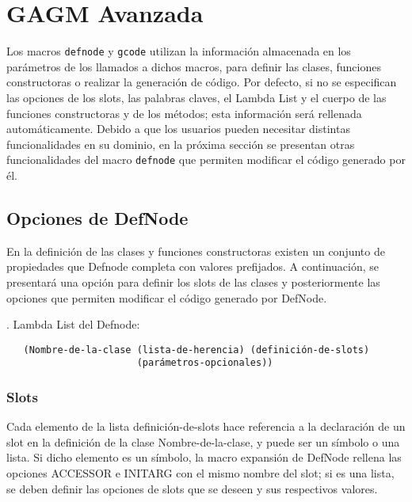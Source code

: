 \chapter{GAGM Avanzada}
\label{chap:GAGMA}


Los macros \texttt{defnode} y \texttt{gcode} utilizan la información almacenada en los parámetros de los llamados a dichos macros, para definir las clases, funciones constructoras o realizar la generación de código. Por defecto, si no se especifican las opciones de los slots, las palabras claves, el Lambda List y el cuerpo de las funciones constructoras y de los métodos; esta información será rellenada automáticamente. Debido a que los usuarios pueden necesitar distintas funcionalidades en su dominio, en la próxima sección se presentan otras funcionalidades del macro \texttt{defnode} que permiten modificar el código generado por él. 

\section{Opciones de DefNode}
\label{defnodeavanzado}
En la definición de las clases y funciones constructoras existen un conjunto de propiedades que Defnode completa con valores prefijados. A continuación, se presentará una opción para definir los slots de las clases y posteriormente las opciones que permiten modificar el código generado por DefNode. 


. Lambda List del Defnode:  
\begin{verbatim}
   (Nombre-de-la-clase (lista-de-herencia) (definición-de-slots) 
                       (parámetros-opcionales))
\end{verbatim}



\subsection{Slots}
Cada elemento de la lista definición-de-slots hace referencia a la declaración de un slot en la definición de la clase Nombre-de-la-clase, y puede ser un símbolo o una lista. Si dicho elemento es un símbolo, la macro expansión de DefNode rellena las opciones ACCESSOR e INITARG con el mismo nombre del slot; si es una lista, se deben definir las opciones de slots que se deseen y sus respectivos valores.  

